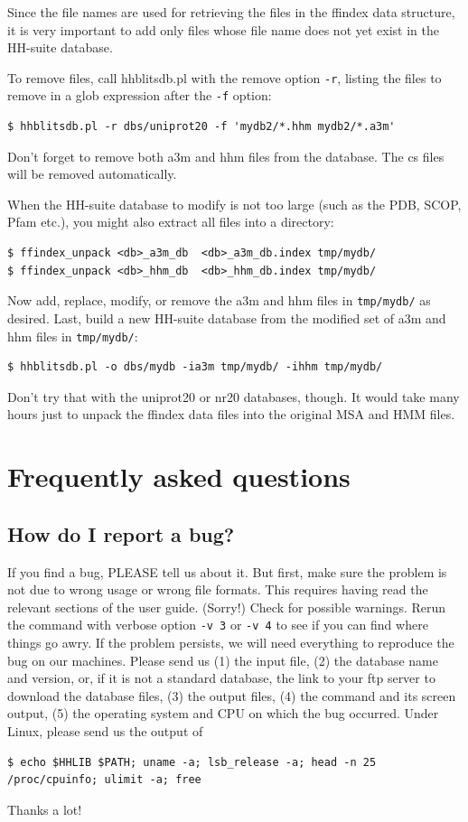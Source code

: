 \documentclass[11pt,a4paper]{article}
\begin{document}
Since the file names are used for retrieving the files in the ffindex data structure, it is very important to add only files whose file name does not yet exist in the HH-suite database.

To remove files, call hhblitsdb.pl with the remove option \verb`-r`, listing the files to remove in a glob expression after the \verb`-f` option:
\begin{verbatim}
$ hhblitsdb.pl -r dbs/uniprot20 -f 'mydb2/*.hhm mydb2/*.a3m' 
\end{verbatim}
Don't forget to remove both a3m and hhm files from the database. The cs files will be removed automatically.

When the HH-suite database to modify is not too large (such as the PDB, SCOP, Pfam etc.), you might also extract all files into a directory:
\begin{verbatim}
$ ffindex_unpack <db>_a3m_db  <db>_a3m_db.index tmp/mydb/
$ ffindex_unpack <db>_hhm_db  <db>_hhm_db.index tmp/mydb/ 
\end{verbatim}
Now add, replace, modify, or remove  the a3m and hhm files in \verb`tmp/mydb/` as desired. Last, build a new HH-suite database from the modified set of a3m and hhm files in \verb`tmp/mydb/`:
\begin{verbatim}
$ hhblitsdb.pl -o dbs/mydb -ia3m tmp/mydb/ -ihhm tmp/mydb/
\end{verbatim}
Don't try that with the uniprot20 or nr20 databases, though. It would take many hours just to unpack the ffindex data files into the original MSA and HMM files.


\section{Frequently asked questions}

\subsection{How do I report a bug?}
If you find a bug, PLEASE tell us about it. But first, make sure the problem is not due to wrong usage or wrong file formats. This requires having read the relevant sections of the user guide. (Sorry!) Check for possible warnings. Rerun the command with verbose option \verb`-v 3` or \verb`-v 4` to see if you can find where things go awry. If the problem persists, we will need everything to reproduce the bug on our machines. Please send us (1) the input file, (2) the database name and version, or, if it is not a standard database, the link to your ftp server to download the database files, (3) the output files, (4) the command and its screen output, (5) the operating system and CPU on which the bug occurred. Under Linux, please send us the output of 
\small
\begin{verbatim}
$ echo $HHLIB $PATH; uname -a; lsb_release -a; head -n 25 /proc/cpuinfo; ulimit -a; free
\end{verbatim}
\normalsize
Thanks a lot!
\end{document}
